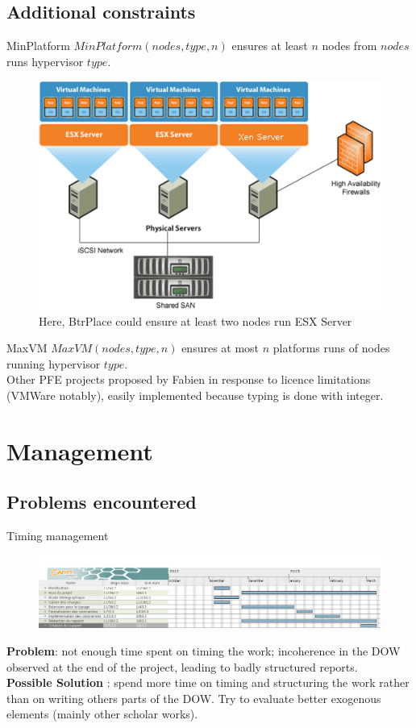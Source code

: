 \documentclass{beamer}
\begin{document}
\subsection{Additional constraints}
\begin{frame}{MinPlatform}
$MinPlatform(nodes, type, n)$ ensures at least $n$ nodes from $nodes$ runs
hypervisor $type$.
\begin{figure}[!ht]
	\centering
	\includegraphics[scale=.4]{imgs/samplecloud.png}
	\caption{Here, BtrPlace could ensure at least two nodes run ESX Server}
\end{figure}
\end{frame}
\begin{frame}{MaxVM}
$MaxVM(nodes, type, n)$ ensures at most $n$ platforms runs of nodes running
hypervisor $type$.\\
\pause Other PFE projects proposed by Fabien in response to licence limitations
(VMWare notably), easily implemented because typing is done with integer.
\end{frame}

\section{Management}
\subsection{Problems encountered}
\begin{frame}{Timing management}
\begin{figure}[!ht]
	\includegraphics[scale=.2]{imgs/gantt2.png}
\end{figure}
\textbf{Problem}: not enough time spent on timing the work; incoherence
in the DOW observed at the end of the project, leading to badly structured
reports.\\
\pause\textbf{Possible Solution} : spend more time on timing and structuring the
work rather than on writing others parts of the DOW. Try to evaluate better
exogenous elements (mainly other scholar works).
\end{frame}
\end{document}
